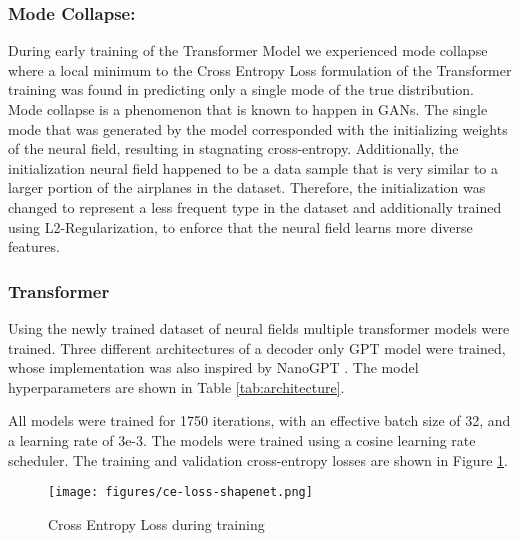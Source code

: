 \subsubsection*{Mode Collapse: }
During early training of the Transformer Model we experienced mode collapse where a local minimum to the Cross Entropy Loss formulation of the Transformer training was found in predicting only a single mode of the true distribution. Mode collapse is a phenomenon that is known to happen in GANs. The single mode that was generated by the model corresponded with the initializing weights of the neural field, resulting in stagnating cross-entropy. Additionally, the initialization neural field happened to be a data sample that is very similar to a larger portion of the airplanes in the dataset. Therefore, the initialization was changed to represent a less frequent type in the dataset and additionally trained using L2-Regularization, to enforce that the neural field learns more diverse features.

\subsubsection*{Transformer}

Using the newly trained dataset of neural fields multiple transformer models were trained. Three different architectures of a decoder only GPT model were trained, whose implementation was also inspired by NanoGPT \cite{Karpathy2022}. The model hyperparameters are shown in Table \ref{tab:architecture}.



All models were trained for 1750 iterations, with an effective batch size of 32, and a learning rate of 3e-3. The models were trained using a cosine learning rate scheduler. The training and validation cross-entropy losses are shown in Figure \ref{fig:loss}.


\begin{figure}[!htbp]
  \centering
  \texttt{[image: figures/ce-loss-shapenet.png]}
  \caption{Cross Entropy Loss during training}
  \label{fig:loss}
\end{figure}


